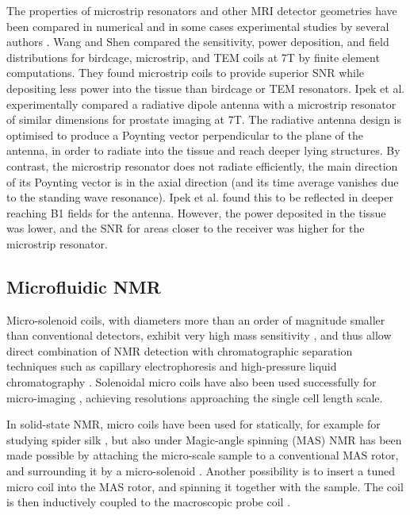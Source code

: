 The properties of
microstrip resonators and other MRI detector geometries have been
compared in numerical and in some cases experimental studies by several
authors \cite{Wang:2006gk,vandenBergen:2009dk,Ipek:2012bm}. Wang and Shen
\cite{Wang:2006gk} compared the sensitivity, power deposition, and field
distributions for birdcage, microstrip, and TEM coils at 7T by finite
element computations. They found microstrip coils to provide superior
SNR while depositing less power into the tissue than birdcage or TEM
resonators. Ipek et al. \cite{Ipek:2012bm} experimentally compared a
radiative dipole antenna with a microstrip resonator of similar
dimensions for prostate imaging at 7T. The radiative antenna design is
optimised to produce a Poynting vector perpendicular to the plane of the
antenna, in order to radiate into the tissue and reach deeper lying
structures. By contrast, the microstrip resonator does not radiate
efficiently, the main direction of its Poynting vector is in the axial
direction (and its time average vanishes due to the standing wave
resonance). Ipek et al. found this to be reflected in deeper reaching B1
fields for the antenna. However, the power deposited in the tissue was
lower, and the SNR for areas closer to the receiver was higher for the
microstrip resonator. 

\subsection{Microfluidic NMR}
Micro-solenoid coils, with diameters more than an order
of magnitude smaller than conventional detectors, exhibit very high mass
sensitivity \cite{Olson:1995vu,Sweedler:1997tl,Lacey:1999vk}, and thus allow
direct combination of NMR detection with
chromatographic separation techniques such as
capillary electrophoresis \cite{Peck:1994hh,Wu:1994ks,Olson:1999ed} and
high-pressure liquid chromatography \cite{Lacey:2001dr}. Solenoidal micro
coils have also been used successfully for micro-imaging
\cite{Seeber:2000iy,Ciobanu:2002wo}, achieving resolutions approaching the
single cell length scale. 

In solid-state NMR, micro coils have been used
for statically, for example for studying spider silk
\cite{KYamauchi:2005jv}, but also under Magic-angle spinning (MAS) NMR has
been made possible by attaching the micro-scale sample to a conventional
MAS rotor, and surrounding it by a micro-solenoid \cite{Kentgens:2008ch}.
Another possibility is to insert a tuned micro coil into the MAS rotor,
and spinning it together with the sample. The coil is then inductively
coupled to the macroscopic probe coil
\cite{sakellariou2007hrh,Jacquinot:2011cj}. 

